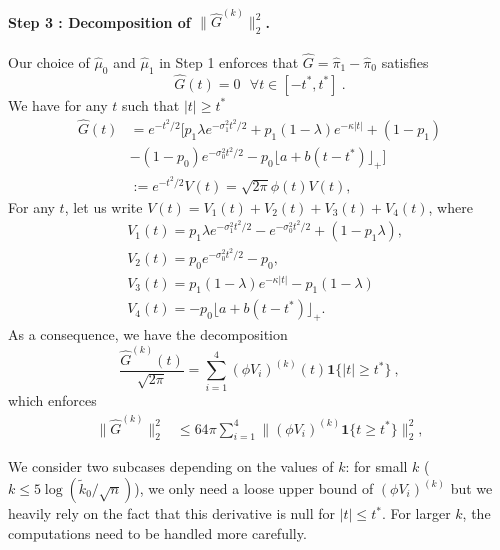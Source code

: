 \documentclass[twoside,11pt]{article}
\newcommand{\<}{\langle}
\renewcommand{\>}{\rangle}
\begin{document}
\paragraph{Step 3 : Decomposition of  $\|\widehat{G}^{(k)}\|_2^2$. }
Our choice of $\widehat{\mu}_0$ and $\widehat{\mu}_1$ in Step 1 enforces that $\widehat{G}=\widehat{\pi}_1-\widehat{\pi}_0$ satisfies
\[\widehat G(t) = 0~~~\forall t \in [-t^*,t^*]\ .\]
We have for any $t$ such that $|t| \geq t^*$
\begin{align*}
\widehat{G}(t) &= e^{-t^2/2} \Big[p_1 \lambda e^{-\sigma_1^2t^2/2} + p_1 (1-\lambda) e^{-\kappa|t|} + (1-p_1)\\
&- (1 - p_0) e^{-\sigma_0^2t^2/2} - p_0\lfloor a + b(t-t^*)\rfloor_+ \Big]\\
&:= e^{-t^2/2}  V(t) = \sqrt{2\pi}\phi(t) V(t),
\end{align*}
For any $t$, let us write $V(t) = V_1(t) + V_2(t) + V_3(t)+V_4(t)$, where
\begin{align*}
&V_1(t) = p_1 \lambda e^{-\sigma_1^2t^2/2} - e^{-\sigma_0^2t^2/2} +(1-p_1 \lambda),\\
&V_2(t) = p_0 e^{-\sigma_0^2t^2/2} - p_0,\\
&V_3(t) =  p_1 (1-\lambda) e^{-\kappa|t|} - p_1 (1-\lambda)\\
&V_4(t) = -p_0\lfloor a + b(t-t^*)\rfloor_+.
\end{align*}
As a consequence, we have the decomposition
$$\frac{\widehat{G}^{(k)}(t)}{\sqrt{2\pi}} = \sum_{i=1}^4(\phi  V_i)^{(k)}(t) \mathbf 1\{|t| \geq t^*\}\ ,$$
which enforces 
\begin{align}
\|\widehat{G}^{(k)}\|_2^2 &\leq 64 \pi \sum_{i=1}^4\|(\phi  V_i)^{(k)}\mathbf 1\{t \geq t^*\}\|_2^2,\label{eq:Gdist}
\end{align}


We consider two subcases depending on the values of $k$: for small $k$ ($k\leq 5\log(\tilde{k}_0/\sqrt{n})$), we only need a loose upper bound of $(\phi  V_i)^{(k)}$ but we heavily rely on the fact that this derivative is null for $|t|\leq t^*$. For larger $k$, the computations need to be handled more carefully.
\end{document}
